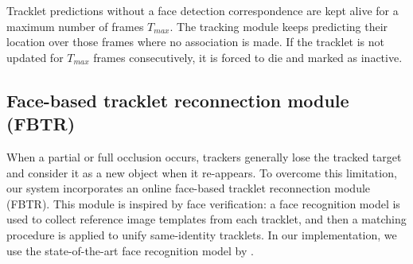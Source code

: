 Tracklet predictions without a face detection correspondence are kept alive for a maximum number of frames $T_{max}$. The tracking module keeps predicting their location over those frames where no association is made. If the tracklet is not updated for $T_{max}$ frames consecutively, it is forced to die and marked as inactive.

    
    
    


\subsection{Face-based tracklet reconnection module (FBTR)}
\label{sec:reID}

When a partial or full occlusion occurs, trackers generally lose the tracked target and consider it as a new object when it re-appears. To overcome this limitation, our system incorporates an online face-based tracklet reconnection module (FBTR). This module is inspired by face verification: a face recognition model is used to collect reference image templates from each tracklet, and then a matching procedure is applied to unify same-identity tracklets. In our implementation, we use the state-of-the-art face recognition model by \cite{deng2019arcface}.

